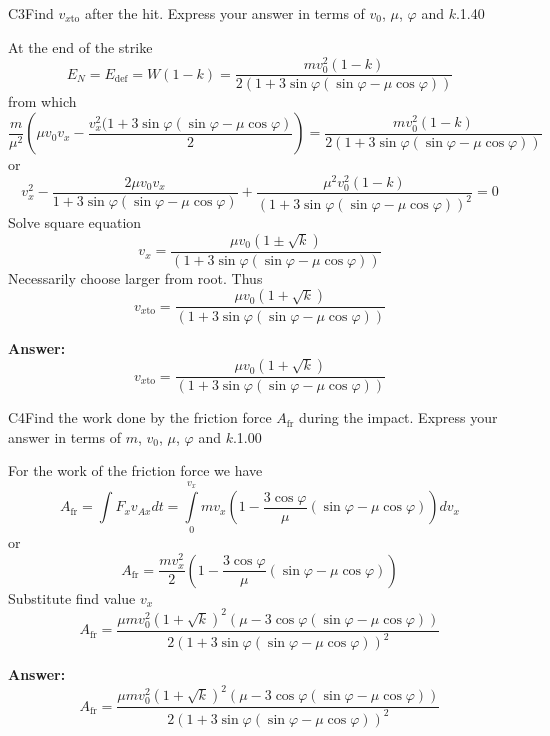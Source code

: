 \documentclass[11pt,a4paper]{article}
\begin{document}
\begin{solcard}{C3}{Find $v_{x\text{to}}$ after the hit. Express your answer in terms of $v_0$, $\mu$, $\varphi$ and $k$.}{1.40}

At the end of the strike $$E_N=E_{\text{def}}=W(1-k)=\frac{mv^2_0(1-k)}{2(1+3\sin\varphi(\sin\varphi-\mu\cos\varphi))} $$ from which $$\frac{m}{\mu^2}\left(\mu v_0v_x-\frac{v^2_x(1+3\sin\varphi(\sin\varphi-\mu\cos\varphi)}{2}\right)=\frac{mv^2_0(1-k)}{2(1+3\sin\varphi(\sin\varphi-\mu\cos\varphi))} $$ or $$v^2_x-\frac{2\mu v_0v_x}{1+3\sin\varphi(\sin\varphi-\mu\cos\varphi)}+\frac{\mu^2v^2_0(1-k)}{(1+3\sin\varphi(\sin\varphi-\mu\cos\varphi))^2}=0 $$ Solve square equation $$v_x=\frac{\mu v_0(1\pm{\sqrt{k}})}{(1+3\sin\varphi(\sin\varphi-\mu\cos\varphi))} $$ Necessarily choose larger from root. Thus $$v_{x\text{to}}=\frac{\mu v_0(1+\sqrt{k})}{(1+3\sin\varphi(\sin\varphi-\mu\cos\varphi))} $$

\par\smallskip\noindent\textbf{Answer:} $$v_{x\text{to}}=\frac{\mu v_0(1+\sqrt{k})}{(1+3\sin\varphi(\sin\varphi-\mu\cos\varphi))} $$
\end{solcard}

\begin{solcard}{C4}{Find the work done by the friction force $A_\text{fr}$ during the impact. Express your answer in terms of $m$, $v_0$, $\mu$, $\varphi$ and $k$.}{1.00}

For the work of the friction force we have $$A_\text{fr}=\int F_x v_{Ax}dt=\int\limits_0^{v_x} mv_x\left(1-\frac{3\cos\varphi}{\mu}\left(\sin\varphi-\mu\cos\varphi\right)\right)dv_x $$ or $$A_\text{fr}=\frac{mv^2_x}{2}\left(1-\frac{3\cos\varphi}{\mu}\left(\sin\varphi-\mu\cos\varphi\right)\right) $$ Substitute find value $v_x$ $$A_\text{fr}=\frac{\mu mv^2_0(1+\sqrt{k})^2(\mu-3\cos\varphi(\sin\varphi-\mu\cos\varphi))}{2(1+3\sin\varphi(\sin\varphi-\mu\cos\varphi))^2} $$

\par\smallskip\noindent\textbf{Answer:} $$A_\text{fr}=\frac{\mu mv^2_0(1+\sqrt{k})^2(\mu-3\cos\varphi(\sin\varphi-\mu\cos\varphi))}{2(1+3\sin\varphi(\sin\varphi-\mu\cos\varphi))^2} $$
\end{solcard}
\end{document}
